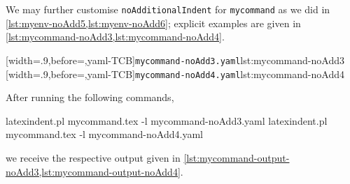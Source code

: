  \begin{example}
 We may further customise \texttt{noAdditionalIndent} for \texttt{mycommand} as we did in
 \vref{lst:myenv-noAdd5,lst:myenv-noAdd6}; explicit examples are given in
 \cref{lst:mycommand-noAdd3,lst:mycommand-noAdd4}.

 \begin{cmhtcbraster}
  [width=.9\linewidth,before=\centering,yaml-TCB]{\texttt{mycommand-noAdd3.yaml}}{lst:mycommand-noAdd3}
  [width=.9\linewidth,before=\centering,yaml-TCB]{\texttt{mycommand-noAdd4.yaml}}{lst:mycommand-noAdd4}
 \end{cmhtcbraster}

 After running the following commands, 

 \begin{commandshell}
latexindent.pl mycommand.tex -l mycommand-noAdd3.yaml  
latexindent.pl mycommand.tex -l mycommand-noAdd4.yaml  
\end{commandshell}
 we receive the respective output given in
 \cref{lst:mycommand-output-noAdd3,lst:mycommand-output-noAdd4}.

 \begin{cmhtcbraster}
 \end{cmhtcbraster}
 \end{example}

